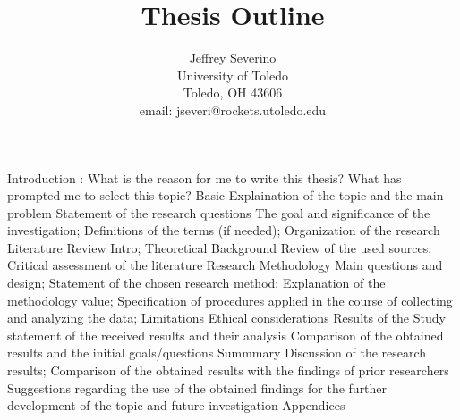 \documentclass[a4paper]{report}
\begin{document}
\begin{titlepage}
    \title{Thesis Outline}
    \author{ Jeffrey Severino \\
        University of Toledo \\
        Toledo, OH  43606 \\
    email: jseveri@rockets.utoledo.edu}


    \maketitle

\end{titlepage}

\renewcommand{\outlineii}{enumerate}
\begin{outline}
    \1 Introduction : What is the reason for me to write this thesis? What has prompted me to 
    select this topic?
        \2 Basic Explaination of the topic and the main problem
        \2 Statement of the research questions
        \2 The goal and significance of the investigation;
        \2 Definitions of the terms (if needed);
        \2 Organization of the research
    \1 Literature Review
        \2 Intro;
        \2 Theoretical Background
        \2 Review of the used sources;
        \2 Critical assessment of the literature
    \1 Research Methodology
        \2 Main questions and design;
        \2 Statement of the chosen research method;
        \2 Explanation of the methodology value;
        \2 Specification of procedures applied in the course of collecting and 
        analyzing the data;
        \2 Limitations
        \2 Ethical considerations
    \1 Results of the Study
        \2 statement of the received results and their analysis
        \2 Comparison of the obtained results and the initial goals/questions
    \1 Summmary
        \2 Discussion of the research results;
        \2 Comparison of the obtained results with the findings of prior researchers
        \2 Suggestions regarding the use of the obtained findings for the further
        development of the topic and future investigation 
     \1 Appendices
\end{outline}
\end{document}
